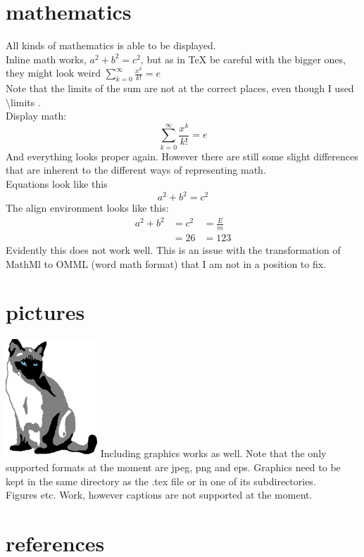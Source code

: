 \documentclass{article}
\begin{document}
\section{mathematics}
All kinds of mathematics is able to be displayed. \\ 
Inline math works, $a^2+b^2=c^2$, but as in TeX be careful with the bigger ones, they might look weird $\sum\limits_{k=0}^{\infty} \frac{x^k}{k!} =e$ \\
Note that the limits of the sum are not at the correct places, even though I used \textbackslash limits . \\ 
Display math: 
\[
\sum\limits_{k=0}^{\infty} \frac{x^k}{k!} =e
\]
And everything looks proper again. However there are still some slight differences that are inherent to the different ways of representing math. \\
Equations look like this
\begin{equation}
a^2+b^2=c^2
\end{equation}
The align environment looks like this: 
\begin{align}
a^2+b^2&=c^2&=\frac{E}{m} \\ 
&=26 &=123
\end{align}
Evidently this does not work well. This is an issue with the transformation of MathMl to OMML (word math format) that I am not in a position to fix. 
\section{pictures}
\includegraphics{image1.jpeg}
Including graphics works as well. Note that the only supported formats at the moment are jpeg, png and eps. Graphics need to be kept in the same directory as the .tex file or in one of its subdirectories.  \\ 

Figures etc. Work, however captions are not supported at the moment. 
\section{references}
\cite{book1} \cite{book2} \cite{booklet1,incollection1}

\end{document}
